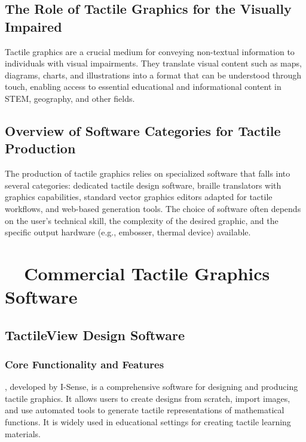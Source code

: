 \subsection{The Role of Tactile Graphics for the Visually Impaired}\label{ch14:ssec:role-of-tactile-graphics}
Tactile graphics are a crucial medium for conveying non-textual information to individuals with visual impairments\supercite{CreatingTactileGraphics, Wall2003}. They translate visual content such as maps, diagrams, charts, and illustrations into a format that can be understood through touch, enabling access to essential educational and informational content in STEM, geography, and other fields\supercite{AELData, GetBraille}.

\subsection{Overview of Software Categories for Tactile Production}\label{ch14:ssec:software-categories}
The production of tactile graphics relies on specialized software that falls into several categories: dedicated tactile design software\supercite{TactileView}, braille translators with graphics capabilities\supercite{DuxburyDBT}, standard vector graphics editors adapted for tactile workflows\supercite{SoftorageInkscape}, and web-based generation tools\supercite{TouchMapper}. The choice of software often depends on the user's technical skill, the complexity of the desired graphic, and the specific output hardware (e.g., embosser, thermal device) available.

\section{~~Commercial Tactile Graphics Software}\label{ch14:sec:commercial-software}
\subsection{TactileView Design Software}\label{ch14:ssec:tactileview}
\subsubsection{Core Functionality and Features}\label{ch14:sssec:tactileview-features}
, developed by I-Sense\supercite{TactileView, TactileViewIrie, EmeraldCoast}, is a comprehensive software for designing and producing tactile graphics. It allows users to create designs from scratch, import images, and use automated tools to generate tactile representations of mathematical functions. It is widely used in educational settings for creating tactile learning materials.

